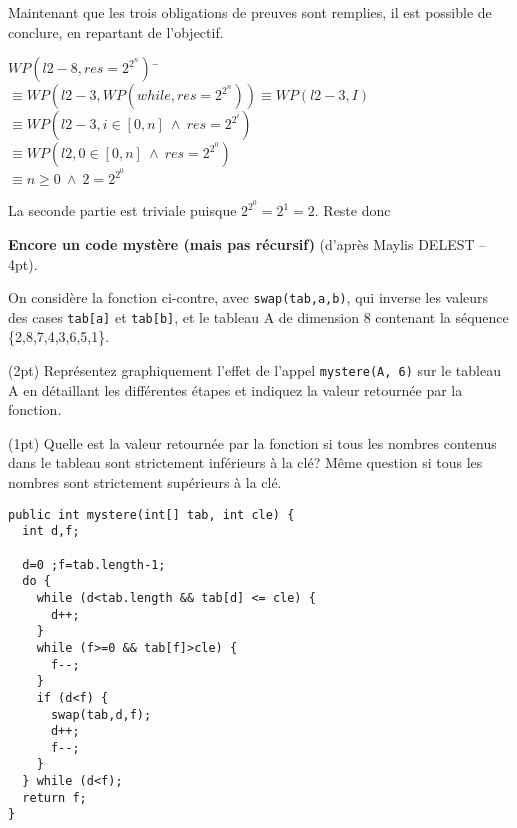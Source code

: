 \documentclass[10pt]{article}\usepackage[correction,nu]{esial}
\begin{document}
\begin{Reponse}
  \bigskip Maintenant que les trois obligations de preuves sont remplies, il
  est possible de conclure, en repartant de l'objectif.

  \begin{tabbing}
  $WP(l2-8,res=2^{2^n})$~\=$\equiv WP(l2-3,WP(while,res=2^{2^n}))\equiv WP(l2-3,I)$\\
  \>$\equiv WP(l2-3,i\in[0,n] ~\wedge~ res=2^{2^i})$\\
  \>$\equiv WP(l2,0\in[0,n] ~\wedge~ res=2^{2^0})$\\
  \>$\equiv n\geq 0 ~\wedge~ 2=2^{2^0}$\\
  \end{tabbing}
  
  La seconde partie est triviale puisque $2^{2^0}=2^1=2$. Reste donc
\end{Reponse}

\bigskip\Exercice\textbf{Encore un code mystère (mais pas récursif)} (d'après
Maylis DELEST -- 4pt).


\noindent\begin{minipage}{.54\linewidth}
On considère la fonction ci-contre, avec
\texttt{swap(tab,a,b)}, qui inverse les valeurs des cases \texttt{tab[a]} et
\texttt{tab[b]}, et le tableau A de dimension 8 contenant la séquence \{2,8,7,4,3,6,5,1\}.

\Question(2pt) Représentez graphiquement l'effet de l'appel \texttt{mystere(A,
  6)} sur le tableau A en détaillant les différentes étapes et indiquez la
valeur retournée par la fonction.

\Question(1pt) Quelle est la valeur retournée par la fonction si tous les
nombres contenus dans le tableau sont strictement inférieurs à la clé? Même
question si tous les nombres sont strictement supérieurs à la clé.
\end{minipage}\hfill\begin{minipage}{.44\linewidth}
\begin{Verbatim}[numbers=right]
public int mystere(int[] tab, int cle) {
  int d,f;

  d=0 ;f=tab.length-1;
  do {
    while (d<tab.length && tab[d] <= cle) {
      d++;
    }
    while (f>=0 && tab[f]>cle) {
      f--;
    }
    if (d<f) {
      swap(tab,d,f);
      d++;
      f--;
    }
  } while (d<f);
  return f;
}
\end{Verbatim}
\end{minipage}
\end{document}
